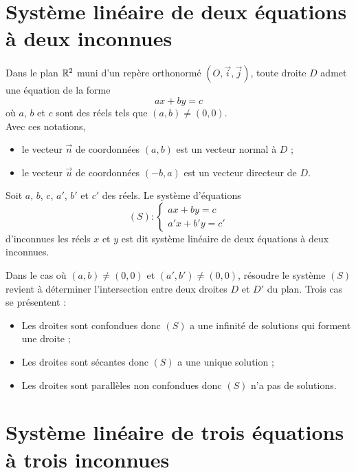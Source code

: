 \section{Système linéaire de deux équations à deux inconnues}
\begin{defprop}
	Dans le plan \(\mathbb{R}^2\) muni d’un repère orthonormé \((O,\vec{i},\vec{j})\), toute droite \(D\) admet une équation de la forme \[ax + by = c\]
	où \(a\), \(b\) et \(c\) sont des réels tels que \((a,b)\neq (0,0)\). \\
	Avec ces notations,
	\begin{itemize}
		\item le vecteur \(\vec{n}\) de coordonnées \((a,b)\) est un vecteur normal à \(D\) ;
		\item le vecteur \(\vec{u}\) de coordonnées \((-b,a)\) est un vecteur directeur de \(D\).
	\end{itemize}
\end{defprop}

\begin{defprop}
	Soit \(a\), \(b\), \(c\), \(a'\), \(b'\) et \(c'\) des réels. Le système d’équations
	\[
		(S) :
		\begin{cases}
			ax + by = c \\
			a'x + b'y = c'
		\end{cases}
	\]
	d’inconnues les réels \(x\) et \(y\) est dit système linéaire de deux équations à deux inconnues.
\end{defprop}

\begin{defprop}
	Dans le cas où \((a,b)\neq (0,0)\) et \((a',b')\neq (0,0)\), résoudre le système \((S)\) revient à  déterminer l’intersection entre deux droites \(D\) et \(D'\) du plan.
	Trois cas se présentent :
	\begin{itemize}
		\item Les droites sont confondues donc \((S)\) a une infinité de solutions qui forment une droite ;
		\item Les droites sont sécantes donc \((S)\) a une unique solution ;
		\item Les droites sont parallèles non confondues donc \((S)\) n’a pas de solutions.
	\end{itemize}
\end{defprop}


\section{Système linéaire de trois équations à trois inconnues}

